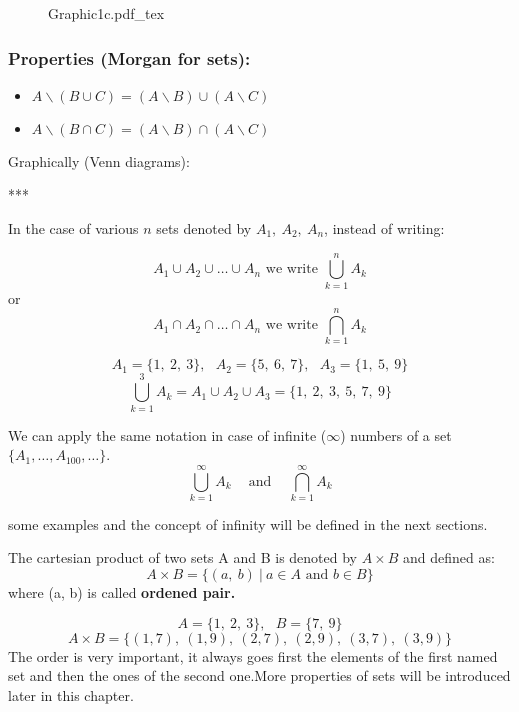 \documentclass[12pt, a4paper]{book}
\newcommand{\incfig}[1]{%
\def\svgscale{1}
{#1.pdf_tex}
}
\begin{document}
\begin{figure}[H]
  \centering
  \incfig{Graphic1c}
\end{figure}

\subsubsection*{Properties (Morgan for sets): }

\begin{itemize}
  \item $A \backslash (B \cup C) = (A \backslash B) \cup (A \backslash C)$
  \item $A \backslash (B \cap C) = (A \backslash B) \cap (A \backslash C)$
\end{itemize}

Graphically (Venn diagrams):

***

\begin{note}
  In the case of various $n$ sets denoted by $A_1, \ A_2, \ A_n$, instead of writing:

  \[
    A_1 \cup A_2 \cup \ldots \cup A_n \text{ we write } \bigcup_{k=1}^{n} A_k
  \]
  or
  \[
    A_1 \cap A_2 \cap \ldots \cap A_n \text{ we write } \bigcap_{k=1}^{n} A_k
  \]
\end{note}

\begin{exmp}
  \[
    A_1=\{1, \ 2, \ 3 \}, \ \ \ A_2=\{ 5,\ 6, \ 7 \}, \ \ \ A_3= \{1, \ 5, \ 9 \}
  \]
  \[
    \bigcup_{k=1}^{3} A_k=A_1 \cup A_2 \cup A_3 = \{ 1, \ 2, \ 3, \ 5, \ 7, \ 9 \}
  \]
\end{exmp}

\begin{rem}
We can apply the same notation in case of infinite ($\infty$) numbers of a set $\{ A_1, \ldots, A_{100}, \ldots \}$.
\[
  \displaystyle\bigcup_{k=1}^{\infty}A_k \ \ \ \ \text{ and } \ \ \ \ \displaystyle\bigcap_{k=1}^{\infty}A_k
\]
\end{rem}
some examples and the concept of infinity will be defined in the next sections.

\begin{defn}
  The cartesian product of two sets A and B is denoted by \boldmath $A \times B$  and defined as:
  \[
    A \times B = \{ (a, \ b  ) \ | \ a \in A \text{ and } b \in B \}
  \]
  \unboldmath
  where (a, b) is called \textbf{ordened pair.} 
\end{defn}

\begin{exmp}
  \[
    A=\{1, \ 2, \ 3 \}, \ \ \ B=\{7, \ 9 \}
  \]
  \[
    A \times B= \{ (1,7), \ (1,9), \ (2,7), \ (2,9), \ (3,7), \ (3,9) \}
  \]
  The order is very important, it always goes first the elements of the first named set and then the ones of the second one.More properties of sets will be introduced later in this chapter.
\end{exmp}
\end{document}

